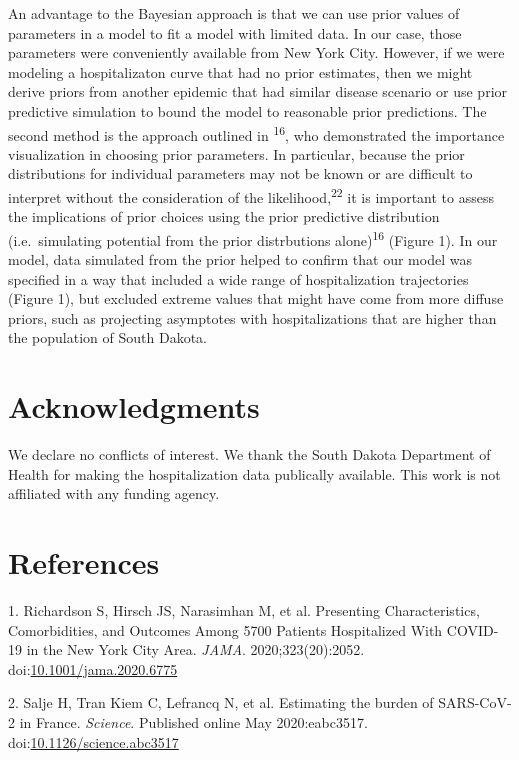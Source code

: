 \documentclass[
]{article}
\begin{document}
An advantage to the Bayesian approach is that we can use prior values of parameters in a model to fit a model with limited data. In our case, those parameters were conveniently available from New York City. However, if we were modeling a hospitalizaton curve that had no prior estimates, then we might derive priors from another epidemic that had similar disease scenario or use prior predictive simulation to bound the model to reasonable prior predictions. The second method is the approach outlined in \textsuperscript{16}, who demonstrated the importance visualization in choosing prior parameters. In particular, because the prior distributions for individual parameters may not be known or are difficult to interpret without the consideration of the likelihood,\textsuperscript{22} it is important to assess the implications of prior choices using the prior predictive distribution (i.e.~simulating potential from the prior distrbutions alone)\textsuperscript{16} (Figure 1). In our model, data simulated from the prior helped to confirm that our model was specified in a way that included a wide range of hospitalization trajectories (Figure 1), but excluded extreme values that might have come from more diffuse priors, such as projecting asymptotes with hospitalizations that are higher than the population of South Dakota.

\hypertarget{acknowledgments}{%
\section{Acknowledgments}\label{acknowledgments}}

We declare no conflicts of interest. We thank the South Dakota Department of Health for making the hospitalization data publically available. This work is not affiliated with any funding agency.

\hypertarget{references}{%
\section{References}\label{references}}

\hypertarget{refs}{}
\leavevmode\hypertarget{ref-richardson_presenting_2020}{}%
1. Richardson S, Hirsch JS, Narasimhan M, et al. Presenting Characteristics, Comorbidities, and Outcomes Among 5700 Patients Hospitalized With COVID-19 in the New York City Area. \emph{JAMA}. 2020;323(20):2052. doi:\href{https://doi.org/10.1001/jama.2020.6775}{10.1001/jama.2020.6775}

\leavevmode\hypertarget{ref-salje_estimating_2020}{}%
2. Salje H, Tran Kiem C, Lefrancq N, et al. Estimating the burden of SARS-CoV-2 in France. \emph{Science}. Published online May 2020:eabc3517. doi:\href{https://doi.org/10.1126/science.abc3517}{10.1126/science.abc3517}
\end{document}

